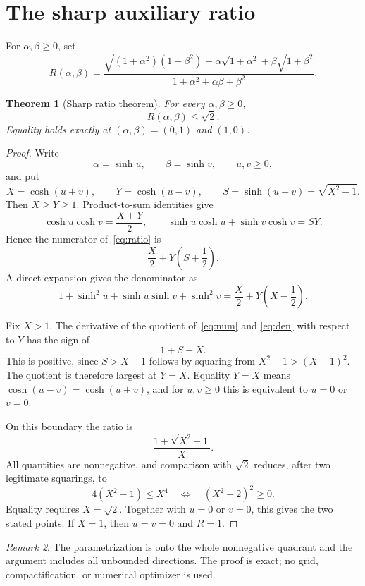\documentclass[11pt]{article}
\newtheorem{theorem}{Theorem}[section]
\theoremstyle{remark}
\newtheorem{remark}[theorem]{Remark}
\begin{document}
\section{The sharp auxiliary ratio}

For $\alpha,\beta\ge0$, set
\begin{equation}\label{eq:ratio}
 R(\alpha,\beta)=
 \frac{\sqrt{(1+\alpha^2)(1+\beta^2)}
 +\alpha\sqrt{1+\alpha^2}+\beta\sqrt{1+\beta^2}}
 {1+\alpha^2+\alpha\beta+\beta^2}.
\end{equation}

\begin{theorem}[Sharp ratio theorem]\label{thm:ratio}
For every $\alpha,\beta\ge0$,
\[
 R(\alpha,\beta)\le\sqrt2.
\]
Equality holds exactly at $(\alpha,\beta)=(0,1)$ and $(1,0)$.
\end{theorem}

\begin{proof}
Write
\[
 \alpha=\sinh u,\qquad \beta=\sinh v,
 \qquad u,v\ge0,
\]
and put
\[
 X=\cosh(u+v),\qquad Y=\cosh(u-v),\qquad
 S=\sinh(u+v)=\sqrt{X^2-1}.
\]
Then $X\ge Y\ge1$.  Product-to-sum identities give
\[
 \cosh u\cosh v=\frac{X+Y}{2},
 \qquad
 \sinh u\cosh u+\sinh v\cosh v=SY.
\]
Hence the numerator of~\eqref{eq:ratio} is
\begin{equation}\label{eq:num}
 \frac X2+Y\left(S+\frac12\right).
\end{equation}
A direct expansion gives the denominator as
\begin{equation}\label{eq:den}
 1+\sinh^2u+\sinh u\sinh v+\sinh^2v
 =\frac X2+Y\left(X-\frac12\right).
\end{equation}

Fix $X>1$.  The derivative of the quotient of~\eqref{eq:num} and
\eqref{eq:den} with respect to $Y$ has the sign of
\[
 1+S-X.
\]
This is positive, since $S>X-1$ follows by squaring from
$X^2-1>(X-1)^2$.  The quotient is therefore largest at $Y=X$.
Equality $Y=X$ means $\cosh(u-v)=\cosh(u+v)$, and for $u,v\ge0$ this is
equivalent to $u=0$ or $v=0$.

On this boundary the ratio is
\[
 \frac{1+\sqrt{X^2-1}}{X}.
\]
All quantities are nonnegative, and comparison with $\sqrt2$ reduces, after
two legitimate squarings, to
\[
 4(X^2-1)\le X^4
 \quad\Longleftrightarrow\quad
 (X^2-2)^2\ge0.
\]
Equality requires $X=\sqrt2$.  Together with $u=0$ or $v=0$, this gives the
two stated points.  If $X=1$, then $u=v=0$ and $R=1$.
\end{proof}

\begin{remark}
The parametrization is onto the whole nonnegative quadrant and the argument
includes all unbounded directions.  The proof is exact; no grid,
compactification, or numerical optimizer is used.
\end{remark}
\end{document}
